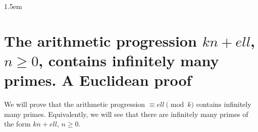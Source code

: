 
\pagestyle{fancy}
\headheight 30pt
\fancyhf{}
\headsep 1.5em

\hypersetup{colorlinks, citecolor=green, linkcolor=blue, urlcolor=blue}

\setlength{\parindent}{20pt}


\newtheorem{theorem}{Theorem}%
\newtheorem{lemma}[theorem]{Lemma}

\theoremstyle{definition}
\newtheorem{definition}[theorem]{Definition}

\renewcommand{\qedsymbol}{\rule{0.7em}{0.7em}} %
\newcommand{\Z}{\mathbb{Z}}
\newcommand{\Q}{\mathbb{Q}}
\newcommand{\C}{\mathbb{C}}
\newcommand{\F}{\mathbb{F}}
\DeclareMathOperator{\degpol}{deg} %
\newsavebox{\equationbox} %
\renewcommand\title{\textbf{The arithmetic progression ${k}n+{ell}$, $n\geqslant0$, contains infinitely many primes.\\ A Euclidean proof}}


\thispagestyle{plain}
\sloppy
\section{The arithmetic progression ${k}n+{ell}$, $n\geqslant0$, contains infinitely many primes. A Euclidean proof}

We will prove that the arithmetic progression $\equiv {ell} \pmod{{k}}$ contains infinitely many primes. Equivalently, we will see that there are infinitely many primes of the form ${k}n+{ell}$, $n\geqslant0$.
